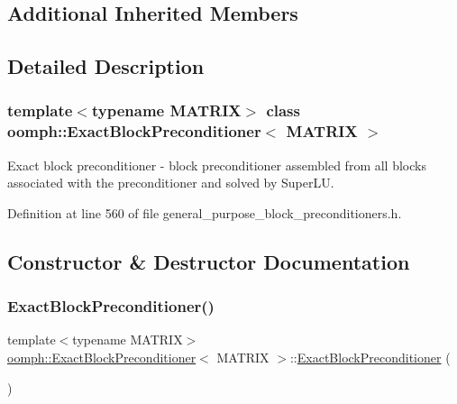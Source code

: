 \subsection*{Additional Inherited Members}


\subsection{Detailed Description}
\subsubsection*{template$<$typename M\+A\+T\+R\+IX$>$\newline
class oomph\+::\+Exact\+Block\+Preconditioner$<$ M\+A\+T\+R\+I\+X $>$}

Exact block preconditioner -\/ block preconditioner assembled from all blocks associated with the preconditioner and solved by Super\+LU. 

Definition at line 560 of file general\+\_\+purpose\+\_\+block\+\_\+preconditioners.\+h.



\subsection{Constructor \& Destructor Documentation}
\mbox{\label{classoomph_1_1ExactBlockPreconditioner_a3bb7887f04ecbcbb6d28e7c53480a2a9}} 
\subsubsection{\texorpdfstring{Exact\+Block\+Preconditioner()}{ExactBlockPreconditioner()}\hspace{0.1cm}{\footnotesize\ttfamily [1/2]}}
{\footnotesize\ttfamily template$<$typename M\+A\+T\+R\+IX$>$ \\
\hyperlink{classoomph_1_1ExactBlockPreconditioner}{oomph\+::\+Exact\+Block\+Preconditioner}$<$ M\+A\+T\+R\+IX $>$\+::\hyperlink{classoomph_1_1ExactBlockPreconditioner}{Exact\+Block\+Preconditioner} (\begin{DoxyParamCaption}{ }\end{DoxyParamCaption})\hspace{0.3cm}{\ttfamily [inline]}}



